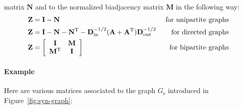 \documentclass[11pt,a4paper]{book}
\begin{document}
matrix $\mathbf N$ and to the normalized biadjacency matrix $\mathbf M$
in the following way:
\begin{align*}
  \mathbf Z &= \mathbf I - \mathbf N & \textnormal{ for unipartite
    graphs } \\
  \mathbf Z &= \mathbf I - \mathbf N -  \mathbf N^{\mathrm T}
   - \mathbf D_{\mathrm{in}}^{-1/2} (\mathbf A + \mathbf A^{\mathrm
     T})\mathbf D_{\mathrm{out}}^{-1/2}
  & \textnormal{ for directed graphs } \\
  \mathbf Z &= \left[ \begin{array}{cc} \mathbf I & \mathbf M \\ \mathbf
      M^{\mathrm T} & \mathbf I \end{array} \right] & \textnormal{ for
    bipartite graphs }
\end{align*}

\paragraph{Example}
Here are various matrices associated to the
graph $G_{\mathrm s}$ introduced in Figure~\ref{fig:syn-graph}: 
\end{document}
